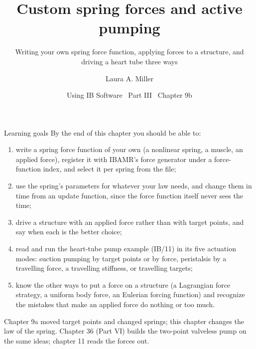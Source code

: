 \documentclass[aspectratio=169,11pt]{beamer}
\title[Custom spring forces and active pumping]{Custom spring forces and active pumping}
\subtitle{Writing your own spring force function, applying forces to a structure, and driving a heart tube three ways}
\author[Miller]{Laura A. Miller}
\institute[UArizona]{Department of Mathematics, University of Arizona}
\date{Using IB Software \textbullet\ Part III \textbullet\ Chapter 9b}
\begin{document}
\begin{frame}[plain]
\end{frame}

\begin{frame}{Learning goals}
\label{fr:goals}
\footnotesize By the end of this chapter you should be able to:
\begin{enumerate}
  \item write a spring force function of your own (a nonlinear spring, a muscle, an applied force), register it with IBAMR's force generator under a force-function index, and select it per spring from the  file;
  \item use the spring's parameters for whatever your law needs, and change them in time from an update function, since the force function itself never sees the time;
  \item drive a structure with an applied force rather than with target points, and say when each is the better choice;
  \item read and run the heart-tube pump example (IB/11) in its five actuation modes: suction pumping by target points or by force, peristalsis by a travelling force, a travelling stiffness, or travelling targets;
  \item know the other ways to put a force on a structure (a Lagrangian force strategy, a uniform body force, an Eulerian forcing function) and recognize the mistakes that make an applied force do nothing or too much.
\end{enumerate}
\begin{punchbox}
\footnotesize Chapter 9a moved target points and changed springs; this chapter changes the law of the spring. Chapter 36 (Part VI) builds the two-point valveless pump on the same ideas; chapter 11 reads the forces out.
\end{punchbox}
\end{frame}
\end{document}
